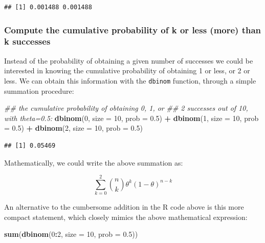\documentclass[12pt,]{krantz}
\newenvironment{Shaded}{\begin{snugshade}}{\end{snugshade}}
\newcommand{\CommentTok}[1]{\textcolor[rgb]{0.56,0.35,0.01}{\textit{#1}}}
\newcommand{\DataTypeTok}[1]{\textcolor[rgb]{0.13,0.29,0.53}{#1}}
\newcommand{\DecValTok}[1]{\textcolor[rgb]{0.00,0.00,0.81}{#1}}
\newcommand{\FloatTok}[1]{\textcolor[rgb]{0.00,0.00,0.81}{#1}}
\newcommand{\KeywordTok}[1]{\textcolor[rgb]{0.13,0.29,0.53}{\textbf{#1}}}
\newcommand{\NormalTok}[1]{#1}
\newcommand{\OperatorTok}[1]{\textcolor[rgb]{0.81,0.36,0.00}{\textbf{#1}}}
\newcommand{\StringTok}[1]{\textcolor[rgb]{0.31,0.60,0.02}{#1}}
\begin{document}
\begin{verbatim}
## [1] 0.001488 0.001488
\end{verbatim}

\hypertarget{compute-the-cumulative-probability-of-k-or-less-more-than-k-successes}{%
\subsubsection{Compute the cumulative probability of k or less (more) than k successes}\label{compute-the-cumulative-probability-of-k-or-less-more-than-k-successes}}

Instead of the probability of obtaining a given number of successes we could be interested in knowing the cumulative probability of obtaining 1 or less, or 2 or less. We can obtain this information with the \texttt{dbinom} function, through a simple summation procedure:

\begin{Shaded}
\begin{Highlighting}[]
\CommentTok{## the cumulative probability of obtaining 0, 1, or}
\CommentTok{## 2 successes out of 10, with theta=0.5:}
\KeywordTok{dbinom}\NormalTok{(}\DecValTok{0}\NormalTok{, }\DataTypeTok{size =} \DecValTok{10}\NormalTok{, }\DataTypeTok{prob =} \FloatTok{0.5}\NormalTok{) }\OperatorTok{+}\StringTok{ }\KeywordTok{dbinom}\NormalTok{(}\DecValTok{1}\NormalTok{, }\DataTypeTok{size =} \DecValTok{10}\NormalTok{, }
  \DataTypeTok{prob =} \FloatTok{0.5}\NormalTok{) }\OperatorTok{+}\StringTok{ }\KeywordTok{dbinom}\NormalTok{(}\DecValTok{2}\NormalTok{, }\DataTypeTok{size =} \DecValTok{10}\NormalTok{, }\DataTypeTok{prob =} \FloatTok{0.5}\NormalTok{)}
\end{Highlighting}
\end{Shaded}

\begin{verbatim}
## [1] 0.05469
\end{verbatim}

Mathematically, we could write the above summation as:

\begin{equation}
\sum_{k=0}^2 \binom{n}{k} \theta^{k} (1-\theta)^{n-k} 
\end{equation}

An alternative to the cumbersome addition in the R code above is this more compact statement, which closely mimics the above mathematical expression:

\begin{Shaded}
\begin{Highlighting}[]
\KeywordTok{sum}\NormalTok{(}\KeywordTok{dbinom}\NormalTok{(}\DecValTok{0}\OperatorTok{:}\DecValTok{2}\NormalTok{, }\DataTypeTok{size =} \DecValTok{10}\NormalTok{, }\DataTypeTok{prob =} \FloatTok{0.5}\NormalTok{))}
\end{Highlighting}
\end{Shaded}
\end{document}
